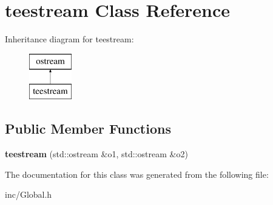 \hypertarget{classteestream}{\section{teestream Class Reference}
\label{classteestream}
}
Inheritance diagram for teestream\-:\begin{figure}[H]
\begin{center}
\leavevmode
\includegraphics[height=2.000000cm]{classteestream}
\end{center}
\end{figure}
\subsection*{Public Member Functions}
\begin{DoxyCompactItemize}
\item 
\hypertarget{classteestream_aa7289fc026f510120ce669da5ad6b92e}{{\bfseries teestream} (std\-::ostream \&o1, std\-::ostream \&o2)}\label{classteestream_aa7289fc026f510120ce669da5ad6b92e}

\end{DoxyCompactItemize}


The documentation for this class was generated from the following file\-:\begin{DoxyCompactItemize}
\item 
inc/Global.\-h\end{DoxyCompactItemize}
